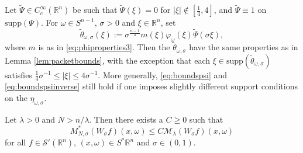 \documentclass[10pt,a4paper]{amsart}
\newcommand {\Rn}{\mathbb{R}^{n}}
\newcommand {\Sp}{S^{*}\Rn}
\newcommand {\Sw}{\mathcal{S}}
\newcommand {\la}{\lambda}
\newcommand {\ph}{\varphi}
\newcommand {\supp}{\mathrm{supp}}
\newcommand {\wt}{\widetilde}
\newcommand {\w}{\omega}
\begin{document}
\begin{remark}\label{rem:thetatilde}
Let $\wt{\Psi}\in C^{\infty}_{c}(\Rn)$ be such that $\wt{\Psi}(\xi)=0$ for $|\xi|\notin [\frac{1}{4},4]$, and $\wt{\Psi}\equiv 1$ on $\supp(\Psi)$. For $\w\in S^{n-1}$, $\sigma>0$ and $\xi\in\Rn$, set
\[
\tilde{\theta}_{\w,\sigma}(\xi):=\sigma^{\frac{n-1}{4}}m(\xi)\ph_{\w}(\xi)\wt{\Psi}(\sigma\xi),
\]
where $m$ is as in \eqref{eq:phiproperties3}.
Then the $\tilde{\theta}_{\w,\sigma}$ have the same properties as in Lemma \ref{lem:packetbounds}, with the exception that each $\xi\in\supp(\tilde{\theta}_{\w,\sigma})$ satisfies $\frac{1}{4}\sigma^{-1}\leq |\xi|\leq 4\sigma^{-1}$. More generally, \eqref{eq:boundspsi} and \eqref{eq:boundspsiinverse} still hold if one imposes slightly different support conditions on the $\eta_{\w,\sigma}$.
\end{remark}

\begin{proposition}\label{prop:maxineq}
Let $\lambda>0$ and $N>n/\la$. Then there exists a $C\geq0$ such that
\[
M_{N,\sigma}^{*}(W_{\sigma}f)(x,\omega)\leq C \mathcal{M}_{\lambda}(W_{\sigma}f)(x,\omega)
\]
for all $f\in \Sw'(\Rn)$, $(x,\w)\in\Sp$ and $\sigma\in(0,1)$.
\end{proposition}
\end{document}
